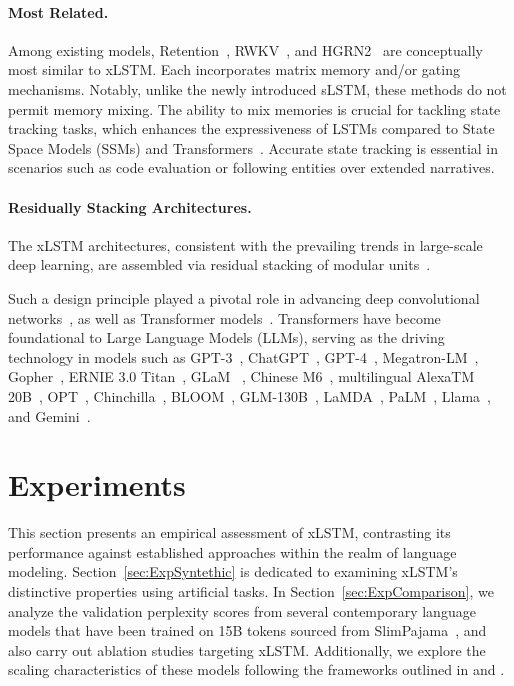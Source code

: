 \paragraph{Most Related.} Among existing models, Retention~\citep{Sun:23arxiv}, RWKV~\citep{Peng:23arxivshort,Peng:24arxivshort}, and HGRN2~\citep{Qin:24arxiv} are conceptually most similar to xLSTM. Each incorporates matrix memory and/or gating mechanisms. Notably, unlike the newly introduced sLSTM, these methods do not permit memory mixing. The ability to mix memories is crucial for tackling state tracking tasks, which enhances the expressiveness of LSTMs compared to State Space Models (SSMs) and Transformers~\citep{Merrill:24,Deletang:23}. Accurate state tracking is essential in scenarios such as code evaluation or following entities over extended narratives.

\paragraph{Residually Stacking Architectures.} The xLSTM architectures, consistent with the prevailing trends in large-scale deep learning, are assembled via residual stacking of modular units~\citep{Srivastava:15,He:16}. 

Such a design principle played a pivotal role in advancing deep convolutional networks~\citep{He:16}, as well as Transformer models~\citep{Vaswani:17}. Transformers have become foundational to Large Language Models (LLMs), serving as the driving technology in models such as GPT-3~\citep{Brown:20short}, ChatGPT~\citep{Schulman:22short}, GPT-4~\citep{Achiam:23gpt4short}, Megatron-LM~\citep{Shoeybi:19}, Gopher~\citep{Rae:21short}, ERNIE 3.0 Titan~\citep{Wang:21arxivshort}, GLaM ~\citep{Du:21glamshort}, Chinese M6~\citep{Lin:21}, multilingual AlexaTM 20B~\citep{Soltan:22}, OPT~\citep{Zhang:22opt}, Chinchilla~\citep{Hoffmann:22short}, BLOOM~\citep{Scao:22arxivshort}, GLM-130B~\citep{Zeng:22arxivshort}, LaMDA~\citep{Thoppilan:22short}, PaLM~\citep{Chowdhery:22short}, Llama~\citep{Touvron:23arxiv}, and Gemini~\citep{GeminiTeam:23arxiv,Reid:24arxiv}.

\section{Experiments}
\label{sec:Exp}

This section presents an empirical assessment of xLSTM, contrasting its performance against established approaches within the realm of language modeling. Section~\ref{sec:ExpSyntethic} is dedicated to examining xLSTM's distinctive properties using artificial tasks. In Section~\ref{sec:ExpComparison}, we analyze the validation perplexity scores from several contemporary language models that have been trained on 15B tokens sourced from SlimPajama~\citep{Soboleva:23}, and also carry out ablation studies targeting xLSTM. Additionally, we explore the scaling characteristics of these models following the frameworks outlined in \citet{Kaplan:20} and \citet{Brown:20short}. 

